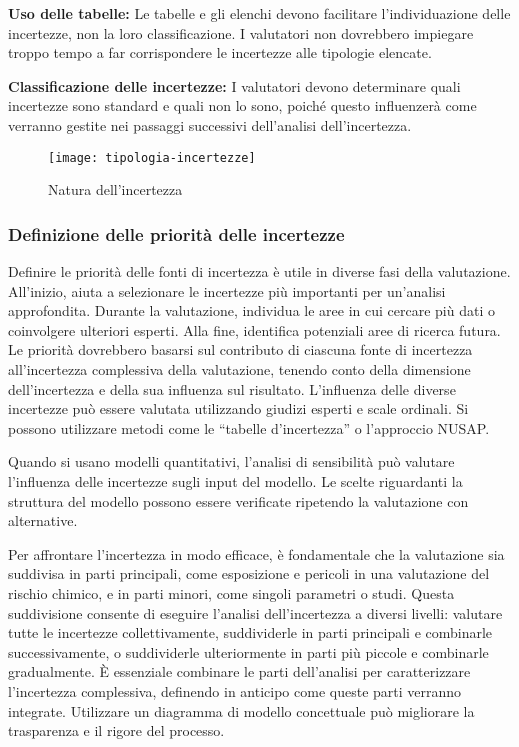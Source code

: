 \textbf{Uso delle tabelle:} Le tabelle e gli elenchi devono facilitare l'individuazione delle incertezze, non la loro classificazione. I valutatori non dovrebbero impiegare troppo tempo a far corrispondere le incertezze alle tipologie elencate.

\textbf{Classificazione delle incertezze:} I valutatori devono determinare quali incertezze sono standard e quali non lo sono, poiché questo influenzerà come verranno gestite nei passaggi successivi dell'analisi dell'incertezza.

\begin{figure}[!ht] 
    \centering 
    \texttt{[image: tipologia-incertezze]} 
    \caption{Natura dell'incertezza}
\end{figure}

\subsubsection{Definizione delle priorità delle incertezze}

Definire le priorità delle fonti di incertezza è utile in diverse fasi della valutazione. All'inizio, aiuta a selezionare le incertezze più importanti per un'analisi approfondita. Durante la valutazione, individua le aree in cui cercare più dati o coinvolgere ulteriori esperti. Alla fine, identifica potenziali aree di ricerca futura. Le priorità dovrebbero basarsi sul contributo di ciascuna fonte di incertezza all'incertezza complessiva della valutazione, tenendo conto della dimensione dell'incertezza e della sua influenza sul risultato.
L'influenza delle diverse incertezze può essere valutata utilizzando giudizi esperti e scale ordinali. Si possono utilizzare metodi come le “tabelle d'incertezza” o l'approccio NUSAP.

Quando si usano modelli quantitativi, l'analisi di sensibilità può valutare l'influenza delle incertezze sugli input del modello. Le scelte riguardanti la struttura del modello possono essere verificate ripetendo la valutazione con alternative.

Per affrontare l'incertezza in modo efficace, è fondamentale che la valutazione sia suddivisa in parti principali, come esposizione e pericoli in una valutazione del rischio chimico, e in parti minori, come singoli parametri o studi. Questa suddivisione consente di eseguire l'analisi dell'incertezza a diversi livelli: valutare tutte le incertezze collettivamente, suddividerle in parti principali e combinarle successivamente, o suddividerle ulteriormente in parti più piccole e combinarle gradualmente. È essenziale combinare le parti dell'analisi per caratterizzare l'incertezza complessiva, definendo in anticipo come queste parti verranno integrate. Utilizzare un diagramma di modello concettuale può migliorare la trasparenza e il rigore del processo.\\

